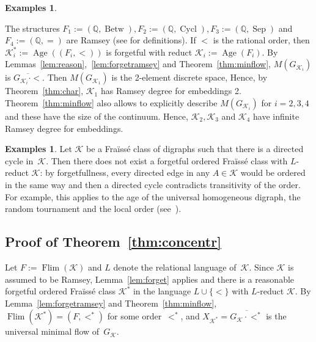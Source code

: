 \documentclass[12pt]{amsart}
\theoremstyle{plain}
\theoremstyle{definition}
\newtheorem{examples}[theorem]{Examples}
\begin{document}
\begin{examples}\label{exas:rationals}

The structures $F_1:=(\mathbb{Q}, \operatorname{Betw}), F_2:=(\mathbb{Q}, \operatorname{Cycl}), F_3:=(\mathbb{Q}, \operatorname{Sep})$ and 
$F_4:=(\mathbb{Q}, =)$ are Ramsey (see \cite{cameron} for definitions). 
If $<$ is the rational order, then ${\mathcal K}_i^*:=\operatorname{Age}((F_i,<))$ is forgetful with reduct ${\mathcal K}_i:=\operatorname{Age}(F_i)$.
By Lemmas~\ref{lem:reason},~\ref{lem:forgetramsey} and Theorem~\ref{thm:minflow}, $M(G_{{\mathcal K}_i})$ is 
$\overline{G_{{\mathcal K}_i}\cdot <}$. Then $M(G_{{\mathcal K}_1})$
is the 2-element discrete space, Hence, by Theorem~\ref{thm:char}, 
${\mathcal K}_1$ has Ramsey degree for embeddings 2. 
Theorem~\ref{thm:minflow} also allows to 
explicitly describe $M(G_{{\mathcal K}_i})$ for $i=2,3,4$ and these have the size of the continuum. 
 Hence, ${\mathcal K}_2,{\mathcal K}_3$ and ${\mathcal K}_4$ have infinite Ramsey degree for embeddings.
\end{examples}

\begin{examples}
Let ${\mathcal K}$ be a Fra\"iss\'e class of digraphs such that there is a directed cycle in~${\mathcal K}$. 
Then there does not exist a forgetful ordered Fra\"iss\'e class with $L$-reduct ${\mathcal K}$:
by forgetfullness, every directed edge in any $A\in {\mathcal K}$ would be ordered in the same way and then
a directed cycle contradicts transitivity of the order. 
For example, this applies to the age of the universal homogeneous digraph, 
the random tournament and the local order (see~\cite{mcph}). 
\end{examples}

\subsection{Proof of Theorem~\ref{thm:concentr}}\label{sec:concentr}

Let $F:=\operatorname{Flim}({\mathcal K})$ and $L$ denote the relational language of~${\mathcal K}$. Since ${\mathcal K}$ is assumed to be Ramsey, Lemma~\ref{lem:forget} applies and
there is a reasonable forgetful ordered Fra\"iss\'e class ${\mathcal K}^*$ in the language $L\cup\{<\}$
with $L$-reduct ${\mathcal K}$. By Lemma~\ref{lem:forgetramsey} and Theorem~\ref{thm:minflow}, 
 $\operatorname{Flim}({\mathcal K}^*)=(F,<^*)$ for some order~$<^*$, and $X_{{\mathcal K}^*}=\overline{G_{\mathcal K}\cdot <^*}$ is the universal minimal flow of~$G_{\mathcal K}$.
\end{document}
